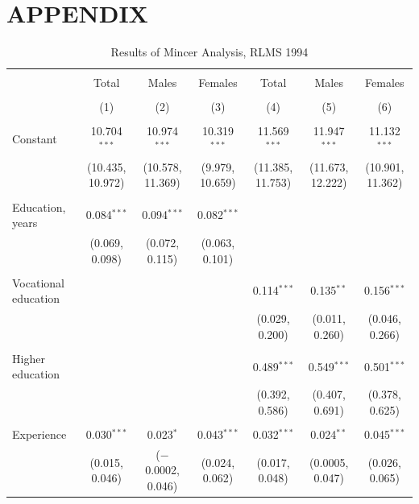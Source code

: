 \documentclass[alpha-refs]{wiley-article-01g}
\begin{document}
\printbibliography


\newpage 
{}
\section*{APPENDIX}
\newpage 

\begin{landscape}

\fontsize{9}{11}
\selectfont

\begin{table}[!htbp] \centering 
\renewcommand{\arraystretch}{1.0}
  \caption{Results of Mincer Analysis, RLMS 1994} 
  \label{} 
\begin{tabular}{@{\extracolsep{5pt}}lcccccc} 
\\[-.8ex]\hline 
\hline \\[-.8ex] 
 & Total & Males & Females & Total & Males & Females \\ 
\\[-.8ex] & (1) & (2) & (3) & (4) & (5) & (6)\\ 
\hline \\[-.8ex] 
 Constant & 10.704$^{***}$ & 10.974$^{***}$ & 10.319$^{***}$ & 11.569$^{***}$ & 11.947$^{***}$ & 11.132$^{***}$ \\ 
  & (10.435, 10.972) & (10.578, 11.369) & (9.979, 10.659) & (11.385, 11.753) & (11.673, 12.222) & (10.901, 11.362) \\ 
  & & & & & & \\ 
 Education, years & 0.084$^{***}$ & 0.094$^{***}$ & 0.082$^{***}$ &  &  &  \\ 
  & (0.069, 0.098) & (0.072, 0.115) & (0.063, 0.101) &  &  &  \\ 
  & & & & & & \\ 
 Vocational education &  &  &  & 0.114$^{***}$ & 0.135$^{**}$ & 0.156$^{***}$ \\ 
  &  &  &  & (0.029, 0.200) & (0.011, 0.260) & (0.046, 0.266) \\ 
  & & & & & & \\ 
 Higher education &  &  &  & 0.489$^{***}$ & 0.549$^{***}$ & 0.501$^{***}$ \\ 
  &  &  &  & (0.392, 0.586) & (0.407, 0.691) & (0.378, 0.625) \\ 
  & & & & & & \\ 
 Experience & 0.030$^{***}$ & 0.023$^{*}$ & 0.043$^{***}$ & 0.032$^{***}$ & 0.024$^{**}$ & 0.045$^{***}$ \\ 
  & (0.015, 0.046) & ($-$0.0002, 0.046) & (0.024, 0.062) & (0.017, 0.048) & (0.0005, 0.047) & (0.026, 0.065) \\ 

\end{tabular}
\end{table}
\end{landscape}
\end{document}
